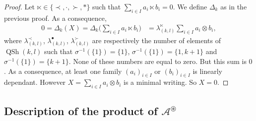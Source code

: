 \documentclass[pdftex]{sigma}
\numberwithin{equation}{section}
\theoremstyle{definition}
\theoremstyle{plain}
\DeclareMathOperator{\batc}{QSh}
\begin{document}
\begin{proof}
Let $\ltimes\in\{\prec,\cdot,\succ,*\}$ such that $\sum_{i\in I} a_i\ltimes b_i=0$.
 We define $\Delta_k$ as in the previous proof. As a consequence,
\begin{align*}
	0=\Delta_k(X)=\Delta_k\bigg( \sum_{i\in I} a_i\ltimes b_i \bigg)&=\lambda^{\ltimes}_{(k,l)}\sum_{i\in I} a_i\otimes b_i,
\end{align*}
where $\lambda_{(k,l)}^{\prec}$, $\lambda_{(k,l)}^{\bullet}$, $\lambda_{(k,l)}^{\succ}$ are respectively the number of elements of $\batc(k,l)$ such that $\sigma^{-1}\!(\{1\})\!=\{1\}$, $\sigma^{-1}(\{1\})=\{1,k+1\}$ and $\sigma^{-1}(\{1\})=\{k+1\}$. None of these numbers are equal to zero. But this sum is $0$. As a consequence, at least one family $(a_i)_{i\in I}$ or $(b_i)_{i\in I}$ is linearly dependant. However $ X=\sum_{i\in I}a_i\otimes b_i$ is a minimal writing. So $X=0$.
\end{proof}

\subsection[Description of the product of A\^{}\{circledast\}]{Description of the product of $\boldsymbol{\mathcal{A}^{\circledast}}$}
\end{document}
